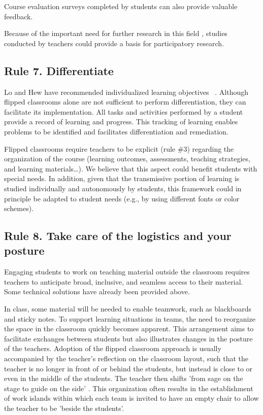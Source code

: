 \documentclass[10pt,letterpaper]{article}
\begin{document}
Course evaluation surveys completed by students can also provide valuable feedback.

Because of the important need for further research in this field \cite{abeysekera_motivation_2015,bishop_flipped_2013,lo_critical_2017}, studies conducted 
by teachers could provide a basis for participatory research.

\subsection{Rule 7. Differentiate}

Lo and Hew have recommended individualized learning objectives ~\cite{lo_critical_2017}. Although flipped classrooms alone are not sufficient
to perform differentiation, they can facilitate its implementation. All tasks and activities performed by a student provide a record
of learning and progress. This tracking of learning enables problems to be identified and facilitates differentiation and remediation.

Flipped classrooms require teachers to be explicit (rule \#3) regarding the organization of the course (learning outcomes, assessments, 
teaching strategies, and learning materials\ldots). We believe that this aspect could benefit students with special needs. 
In addition, given that the transmissive portion of learning is studied individually and autonomously by students, 
this framework could in principle be adapted to student needs (e.g., by using different fonts or color schemes).


\subsection{Rule 8. Take care of the logistics and your posture}

Engaging students to work on teaching material outside the classroom requires teachers to anticipate broad, inclusive, 
and seamless access to their material. Some technical solutions have already been provided above.

In class, some material will be needed to enable teamwork, such as blackboards and sticky notes. 
To support learning situations in teams, the need to reorganize the space in the classroom
quickly becomes apparent. 
This arrangement aims to facilitate exchanges between students but also illustrates changes in the posture of the teachers. 
Adoption of the flipped classroom approach is usually accompanied by the teacher’s reflection on the classroom layout, such that 
the teacher is no longer in front of or behind the students, but instead is close to or even in the middle of the students. 
The teacher then shifts 'from sage on the stage to guide on the side' \cite{king_sage_1993}. 
This organization often results in the establishment of work islands within which each team is invited to have 
an empty chair to allow the teacher to be 'beside the students'.
\end{document}
